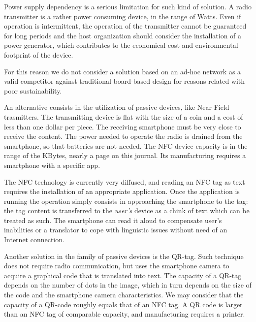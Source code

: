\documentclass[sustainability,article,submit,pdftex,moreauthors]{Definitions/mdpi}
\begin{document}

Power supply dependency is a serious limitation for such kind of solution. A radio transmitter is a rather power consuming device, in the range of Watts. Even if operation is intermittent, the operation of the transmitter cannot be guaranteed for long periods and the host organization should consider the installation of a power generator, which contributes to the economical cost and environmental footprint of the device.

For this reason we do not consider a solution based on an ad-hoc network as a valid competitor against traditional board-based design for reasons related with poor sustainability.

An alternative consists in the utilization of passive devices, like Near Field trasmitters. The transmitting device is flat with the size of a coin and a cost of less than one dollar per piece. The receiving smartphone must be very close to receive the content. The power needed to operate the radio is drained from the smartphone, so that batteries are not needed. The NFC device capacity is in the range of the KBytes, nearly a page on this journal. Its manufacturing requires a smartphone with a specific app.

The NFC technology is currently very diffused, and reading an NFC tag as text requires the installation of an appropriate application. Once the application is running the operation simply consists in approaching the smartphone to the tag: the tag content is transferred to the {\em user's} device as a chink of text which can be treated as such. The smartphone can read it aloud to compensate user's inabilities or a translator to cope with linguistic issues without need of an Internet connection.

Another solution in the family of passive devices is the QR-tag. Such technique does not require radio communication, but uses the smartphone camera to acquire a graphical code that is translated into text. The capacity of a QR-tag depends on the number of dots in the image, which in turn depends on the size of the code and the smartphone camera characteristics. We may consider that the capacity of a QR-code roughly equals that of an NFC tag. A QR code is larger than an NFC tag of comparable capacity, and manufacturing requires a printer.
\end{document}
